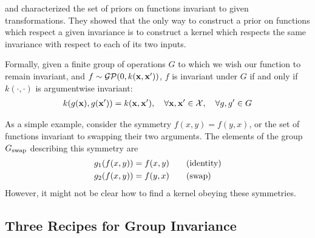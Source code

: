 
\citet{ginsbourger2012argumentwise} and \citet{Invariances13} characterized the set of \gp{} priors on functions invariant to given transformations.
They showed that the only way to construct a prior on functions which respect a given invariance is to construct a kernel which respects the same invariance with respect to each of its two inputs.

Formally, given a finite group of operations $G$ to which we wish our function to remain invariant, and $f \sim \mathcal{GP}\!\left(0,k({\bf{x}},{\bf{x}}')\right)$, $f$ is invariant under $G$ if and only if $k(\cdot, \cdot)$ is argumentwise invariant:
%
\begin{align}
k( g({\bf{x}}), g({\bf{x}}')) = k({\bf{x}}, {\bf{x}}'), \quad \forall {\bf{x}}, {\bf{x}}' \in \mathcal{X}, \quad \forall g, g' \in G
\end{align}

\def\gswitch{G_\textnormal{swap}}

As a simple example, consider the symmetry $f(x, y) = f(y,x)$, or the set of functions invariant to swapping their two arguments.
The elements of the group $\gswitch$ describing this symmetry are
%
\begin{align}
g_1(f(x,y)) & = f(x,y) \qquad \textnormal{(identity)}\\
g_2(f(x,y)) & = f(y,x) \qquad \textnormal{(swap)}
\end{align}
%
However, it might not be clear how to find a kernel obeying these symmetries.


\subsection{Three Recipes for Group Invariance}

